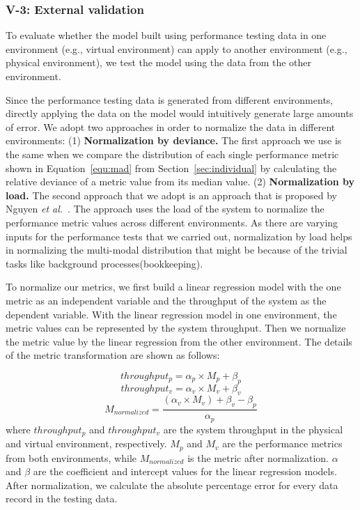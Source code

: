 \documentclass[smallextended]{svjour3}       %
\begin{document}
\subsubsection{V-3: External validation}
To evaluate whether the model built using performance testing data in one environment (e.g., virtual environment) can apply to another environment (e.g., physical environment), we test the model using the data from the other environment.

Since the performance testing data is generated from different environments, directly applying the data on the model would intuitively generate large amounts of error. We adopt two approaches in order to normalize the data in different environments: (1) \textbf{Normalization by deviance.} The first approach we use is the same when we compare the distribution of each single performance metric shown in Equation~\ref{equ:mad} from Section~\ref{sec:individual} by calculating the relative deviance of a metric value from its median value. (2) \textbf{Normalization by load.} The second approach that we adopt is an approach that is proposed by Nguyen \textit{et al.}~\cite{Nguyen:2012:ADP:2188286.2188344}. The approach uses the load of the system to normalize the performance metric values across different environments. As there are varying inputs for the performance tests that we carried out, normalization by load helps in normalizing the multi-modal distribution that might be because of the trivial tasks like background processes(bookkeeping).



To normalize our metrics, we first build a linear regression model with the one metric as an independent variable and the throughput of the system as the dependent variable. With the linear regression model in one environment, the metric values can be represented by the system throughput. Then we normalize the metric value by the linear regression from the other environment. The details of the metric transformation are shown as follows:

\begin{equation*}
throughput_{p}= \alpha_{p} \times M_{p} + \beta_{p}
\end{equation*}
\vspace{-0.4cm}
\begin{equation*}
throughput_{v}= \alpha_{v} \times M_{v} + \beta_{v}
\end{equation*}
\vspace{-0.4cm}
\begin{equation*}
M_{normalized} = \frac{(\alpha_{v} \times M_{v})+\beta_{v}-\beta_{p}}{\alpha_{p}}
\end{equation*}
where $throughput_{p}$ and $throughput_{v}$ are the system throughput in the physical and virtual environment, respectively. $M_{p}$ and $M_{v}$ are the performance metrics from both environments, while $M_{normalized}$ is the metric after normalization. $\alpha$ and $\beta$ are the coefficient and intercept values for the linear regression models. After normalization, we calculate the absolute percentage error for every data record in the testing data.
\end{document}
